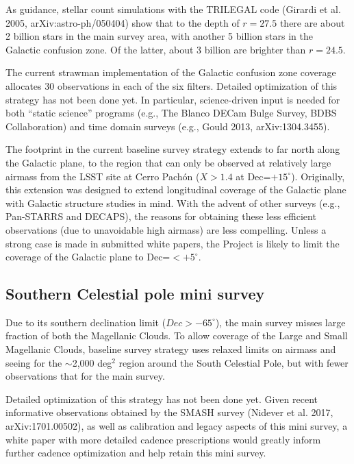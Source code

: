 \documentclass[DM,lsstdraft,toc,usenatbib]{lsstdoc}
\begin{document}
As guidance, stellar count simulations with the TRILEGAL code (Girardi et al. 2005, 
arXiv:astro-ph/050404) show that to the depth of $r=27.5$ there are about 2 billion
stars in the main survey area, with another 5 billion stars in the Galactic confusion 
zone. Of the latter, about 3 billion are brighter than $r=24.5$.  

The current strawman implementation of the Galactic confusion zone coverage allocates 
30 observations in each of the six filters. Detailed optimization of this strategy has not 
been done yet. In particular, science-driven input is needed for both ``static science''
programs (e.g., The Blanco DECam Bulge Survey, BDBS Collaboration) and  time domain
surveys (e.g., Gould 2013, arXiv:1304.3455). 

The footprint in the current baseline survey strategy extends to far north along the Galactic
plane, to the region that can only be observed at relatively large airmass from the LSST
site at Cerro Pach\'on ($X>1.4$ at Dec=$+15^\circ$). Originally, this extension was designed 
to extend longitudinal coverage of the Galactic plane with Galactic structure studies in mind. 
With the advent of other surveys (e.g., Pan-STARRS and DECAPS), the reasons for obtaining 
these less efficient observations (due to unavoidable high airmass) are less compelling. 
Unless a strong case is made in submitted white papers, the Project is likely to limit the 
coverage of the Galactic plane to Dec=$<+5^\circ$. 


\subsection{Southern Celestial pole mini survey}

Due to its southern declination limit ($Dec > -65^\circ$), the main survey misses large fraction
of both the Magellanic Clouds. To allow coverage of the Large and Small Magellanic Clouds, 
baseline survey strategy uses relaxed limits on airmass and seeing for the $\sim$2,000 deg$^2$ region 
around the South Celestial Pole, but with fewer observations that for the main survey. 

Detailed optimization of this strategy has not been done yet. Given recent informative observations 
obtained by the SMASH survey (Nidever et al. 2017, arXiv:1701.00502), as well as calibration 
and legacy aspects of this mini survey, a white paper with more detailed cadence prescriptions
would greatly inform further cadence optimization and help retain this mini survey. 
\end{document}
